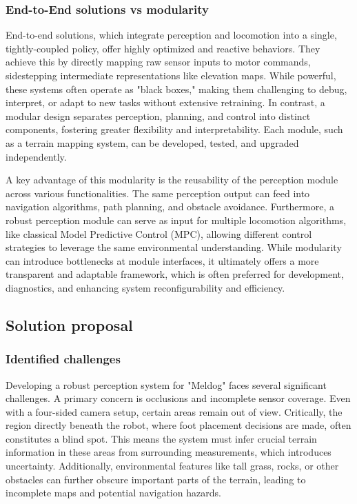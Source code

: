 \subsubsection{End-to-End solutions vs modularity}
End-to-end solutions, which integrate perception and locomotion into a single, tightly-coupled policy, offer highly optimized and reactive behaviors. They achieve this by directly mapping raw sensor inputs to motor commands, sidestepping intermediate representations like elevation maps. While powerful, these systems often operate as "black boxes," making them challenging to debug, interpret, or adapt to new tasks without extensive retraining. In contrast, a modular design separates perception, planning, and control into distinct components, fostering greater flexibility and interpretability. Each module, such as a terrain mapping system, can be developed, tested, and upgraded independently.

A key advantage of this modularity is the reusability of the perception module across various functionalities. The same perception output can feed into navigation algorithms, path planning, and obstacle avoidance. Furthermore, a robust perception module can serve as input for multiple locomotion algorithms, like classical Model Predictive Control (MPC), allowing different control strategies to leverage the same environmental understanding. While modularity can introduce bottlenecks at module interfaces, it ultimately offers a more transparent and adaptable framework, which is often preferred for development, diagnostics, and enhancing system reconfigurability and efficiency.

\subsection{Solution proposal}

\subsubsection{Identified challenges}

Developing a robust perception system for "Meldog" faces several significant challenges. A primary concern is occlusions and incomplete sensor coverage. Even with a four-sided camera setup, certain areas remain out of view. Critically, the region directly beneath the robot, where foot placement decisions are made, often constitutes a blind spot. This means the system must infer crucial terrain information in these areas from surrounding measurements, which introduces uncertainty. Additionally, environmental features like tall grass, rocks, or other obstacles can further obscure important parts of the terrain, leading to incomplete maps and potential navigation hazards.

